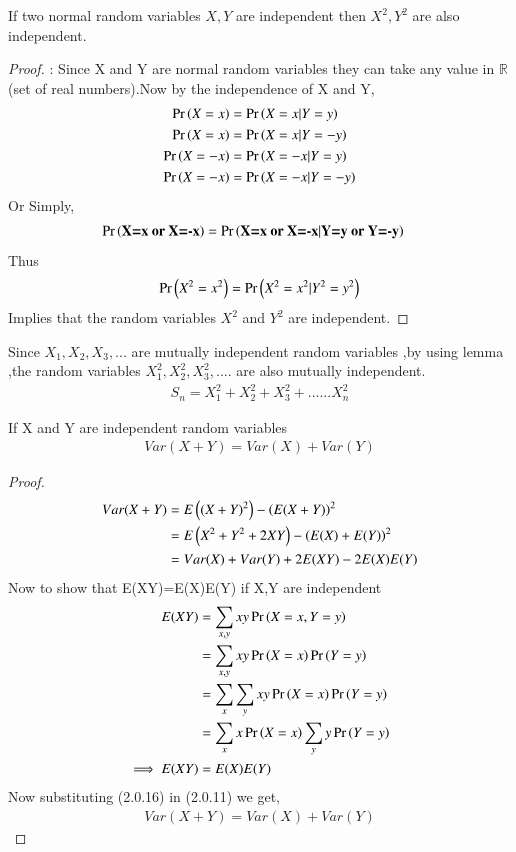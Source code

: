 \documentclass[journal,12pt,twocolumn]{IEEEtran}
\begin{document}
\begin{lemma}
If two normal random variables $X,Y$ are independent then $X^2,Y^2$ are also independent.
\end{lemma}
\begin{proof}: Since X and Y are normal random variables they can take any value in $\mathbb{R}$(set of real numbers).Now by the independence of X and Y,
\begin{align}
    \Pr\left(X=x\right)&=\Pr\left(X=x|Y=y\right)\\
    \Pr\left(X=x\right)&=\Pr\left(X=x|Y=-y\right)\\
    \Pr\left(X=-x\right)&=\Pr\left(X=-x|Y=y\right)\\
    \Pr\left(X=-x\right)&=\Pr\left(X=-x|Y=-y\right)
\end{align}
Or Simply,
\begin{align}
 \Pr\left(\textbf{X=x or X=-x}\right)&=\Pr\left(\textbf{X=x or X=-x}|\textbf{Y=y or Y=-y}\right)
\end{align}
Thus
\begin{align}
    \Pr\left(X^{2}=x^{2}\right)=\Pr\left(X^{2}=x^{2}|Y^{2}=y^{2}\right)
\end{align}
Implies that the random variables $X^{2}$ and $Y^{2}$ are independent.
\end{proof}
Since $X_{1},X_{2},X_{3},...$ are mutually independent random variables ,by using lemma  ,the random variables $X_{1}^{2},X_{2}^{2},X_{3}^{2},....$  are also mutually independent.
\begin{align}
    S_{n}=X_{1}^2+X_{2}^2+X_{3}^2+......X_{n}^2
\end{align}
 \begin{lemma}
 If X and Y are independent random variables
 \begin{align}
     Var(X+Y)=Var(X)+Var(Y)
 \end{align}
 \end{lemma}
 \begin{proof}
 \begin{align}
    Var(X+Y)&=E\left((X+Y)^{2}\right)-\left(E(X+Y)\right)^{2}
    \\      &=E\left(X^{2}+Y^{2}+2XY\right)-\left(E(X)+E(Y)\right)^{2}
    \\      &=Var(X)+Var(Y)+2E(XY)-2E(X)E(Y)
 \end{align}
 Now to show that E(XY)=E(X)E(Y) if X,Y are independent
 \begin{align}
     E(XY)&=\sum_{x,y}xy\Pr\left(X=x,Y=y\right)
     \\ &=\sum_{x,y}xy\Pr\left(X=x\right)\Pr\left(Y=y\right)
     \\ &=\sum_{x}\sum_{y}xy\Pr\left(X=x\right)\Pr\left(Y=y\right)
     \\ &=\sum_{x}x\Pr\left(X=x\right)\sum_{y}y\Pr\left(Y=y\right)
     \\\implies E(XY) &=E(X)E(Y)
 \end{align}
 Now substituting (2.0.16) in (2.0.11) we get,
 \begin{align}
     Var(X+Y)=Var(X)+Var(Y)
 \end{align}
 \end{proof}
\end{document}
